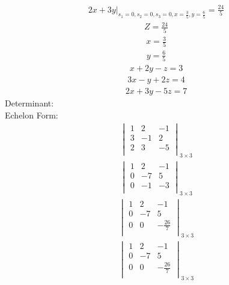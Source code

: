 \documentclass{article}
\begin{document}
\begin{align*}
\left.2x + 3y\right|_{s_{1}=0,s_{2}=0,s_{3}=0,x=\frac{3}{5},y=\frac{6}{5}}=\frac{24}{5}\end{align*}
\begin{align*}
Z=\frac{24}{5}\end{align*}
\begin{align*}
x=\frac{3}{5}\end{align*}
\begin{align*}
y=\frac{6}{5}\end{align*}
\begin{align*}
x + 2y - z=3\end{align*}
\begin{align*}
3x - y + 2z=4\end{align*}
\begin{align*}
2x + 3y - 5z=7\end{align*}
Determinant:\\
Echelon Form:\\
\begin{align*}
\begin{vmatrix}
1 & 2 & -1\\
3 & -1 & 2\\
2 & 3 & -5\\
\end{vmatrix}_{3\times 3}
\end{align*}
\begin{align*}
\begin{vmatrix}
1 & 2 & -1\\
0 & -7 & 5\\
0 & -1 & -3\\
\end{vmatrix}_{3\times 3}
\end{align*}
\begin{align*}
\begin{vmatrix}
1 & 2 & -1\\
0 & -7 & 5\\
0 & 0 & -\frac{26}{7}\\
\end{vmatrix}_{3\times 3}
\end{align*}
\begin{align*}
\begin{vmatrix}
1 & 2 & -1\\
0 & -7 & 5\\
0 & 0 & -\frac{26}{7}\\
\end{vmatrix}_{3\times 3}
\end{align*}
\end{document}
